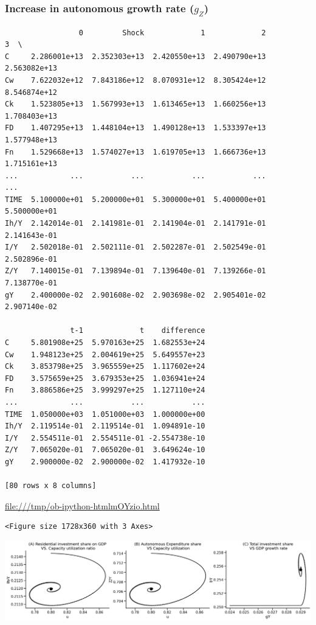 \documentclass[11pt]{article}
\begin{document}
\subsubsection{Increase in autonomous growth rate (\(g_Z\))}
\label{sec:org926ebfa}

\begin{verbatim}
                 0         Shock             1             2             3  \
C     2.286001e+13  2.352303e+13  2.420550e+13  2.490790e+13  2.563082e+13   
Cw    7.622032e+12  7.843186e+12  8.070931e+12  8.305424e+12  8.546874e+12   
Ck    1.523805e+13  1.567993e+13  1.613465e+13  1.660256e+13  1.708403e+13   
FD    1.407295e+13  1.448104e+13  1.490128e+13  1.533397e+13  1.577948e+13   
Fn    1.529668e+13  1.574027e+13  1.619705e+13  1.666736e+13  1.715161e+13   
...            ...           ...           ...           ...           ...   
TIME  5.100000e+01  5.200000e+01  5.300000e+01  5.400000e+01  5.500000e+01   
Ih/Y  2.142014e-01  2.141981e-01  2.141904e-01  2.141791e-01  2.141643e-01   
I/Y   2.502018e-01  2.502111e-01  2.502287e-01  2.502549e-01  2.502896e-01   
Z/Y   7.140015e-01  7.139894e-01  7.139640e-01  7.139266e-01  7.138770e-01   
gY    2.400000e-02  2.901608e-02  2.903698e-02  2.905401e-02  2.907140e-02   

               t-1             t    difference  
C     5.801908e+25  5.970163e+25  1.682553e+24  
Cw    1.948123e+25  2.004619e+25  5.649557e+23  
Ck    3.853798e+25  3.965559e+25  1.117602e+24  
FD    3.575659e+25  3.679353e+25  1.036941e+24  
Fn    3.886586e+25  3.999297e+25  1.127110e+24  
...            ...           ...           ...  
TIME  1.050000e+03  1.051000e+03  1.000000e+00  
Ih/Y  2.119514e-01  2.119514e-01  1.094891e-10  
I/Y   2.554511e-01  2.554511e-01 -2.554738e-10  
Z/Y   7.065020e-01  7.065020e-01  3.649624e-10  
gY    2.900000e-02  2.900000e-02  1.417932e-10  

[80 rows x 8 columns]
\end{verbatim}


\url{file:///tmp/ob-ipython-htmlmOYzio.html}

\begin{verbatim}
<Figure size 1728x360 with 3 Axes>
\end{verbatim}


\begin{center}
\includegraphics[width=.9\linewidth]{obipy-resources/833ba20b4aec1c9746a2e4fcac62a826eabb201d/83659ba2b3e2ae0aad89f27149fcb260b24a02fa.png}
\end{center}
\end{document}
